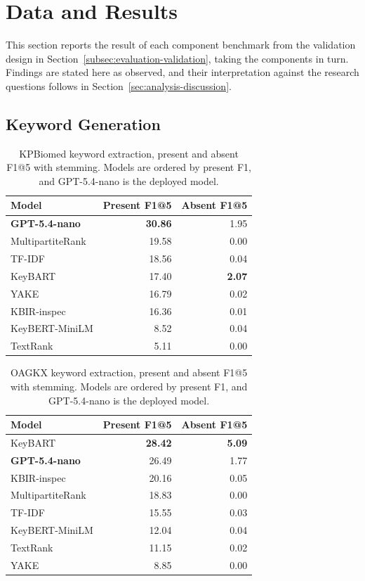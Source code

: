 \section{Data and Results}
\label{sec:data-results}

This section reports the result of each component benchmark from the validation design in Section~\ref{subsec:evaluation-validation}, taking the components in turn. Findings are stated here as observed, and their interpretation against the research questions follows in Section~\ref{sec:analysis-discussion}.

\subsection{Keyword Generation}
\label{sec:results-keywords}

\begin{table}[t]
\caption{KPBiomed keyword extraction, present and absent F1@5 with stemming. Models are ordered by present F1, and GPT-5.4-nano is the deployed model.}
\label{tab:kw-kpbiomed}
\centering
\footnotesize
\begin{tabular}{@{}lrr@{}}
\toprule
Model & Present F1@5 & Absent F1@5 \\
\midrule
\textbf{GPT-5.4-nano} & \textbf{30.86} & 1.95 \\
MultipartiteRank & 19.58 & 0.00 \\
TF-IDF & 18.56 & 0.04 \\
KeyBART & 17.40 & \textbf{2.07} \\
YAKE & 16.79 & 0.02 \\
KBIR-inspec & 16.36 & 0.01 \\
KeyBERT-MiniLM & 8.52 & 0.04 \\
TextRank & 5.11 & 0.00 \\
\bottomrule
\end{tabular}
\end{table}


\begin{table}[t]
\caption{OAGKX keyword extraction, present and absent F1@5 with stemming. Models are ordered by present F1, and GPT-5.4-nano is the deployed model.}
\label{tab:kw-oagkx}
\centering
\footnotesize
\begin{tabular}{@{}lrr@{}}
\toprule
Model & Present F1@5 & Absent F1@5 \\
\midrule
KeyBART & \textbf{28.42} & \textbf{5.09} \\
\textbf{GPT-5.4-nano} & 26.49 & 1.77 \\
KBIR-inspec & 20.16 & 0.05 \\
MultipartiteRank & 18.83 & 0.00 \\
TF-IDF & 15.55 & 0.03 \\
KeyBERT-MiniLM & 12.04 & 0.04 \\
TextRank & 11.15 & 0.02 \\
YAKE & 8.85 & 0.00 \\
\bottomrule
\end{tabular}
\end{table}

